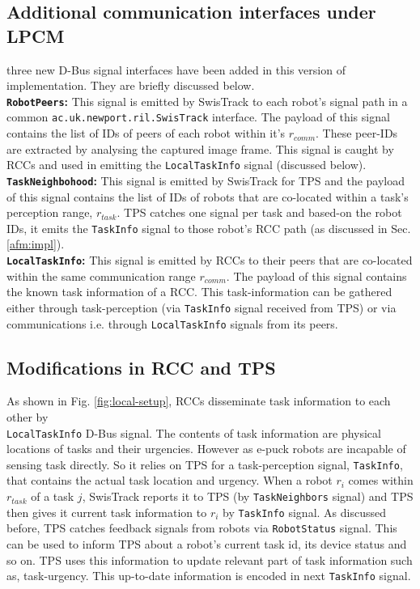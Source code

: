 \subsection*{Additional communication interfaces under LPCM}
 three new D-Bus signal interfaces  have been added in this version of implementation. They are briefly discussed below.\\
\textbf{\texttt{RobotPeers}: }This signal is emitted by SwisTrack to each robot's signal path in a common \texttt{ac.uk.newport.ril.SwisTrack} interface. The payload of this signal contains the list of IDs of peers of each robot within it's $r_{comm}$.  These peer-IDs are extracted by analysing the captured image frame.  This signal is caught by RCCs and used in emitting the \texttt{LocalTaskInfo} signal (discussed below).\\
\textbf{\texttt{TaskNeighbohood}: }This signal is emitted by SwisTrack for TPS and the payload of this signal contains the list of IDs of robots that are co-located within a task's perception range, $r_{task}$. TPS catches one signal per task and based-on the robot IDs, it emits the \texttt{TaskInfo} signal to those robot's RCC path (as discussed in Sec. \ref{afm:impl}).\\ 
\textbf{\texttt{LocalTaskInfo}: }This signal is emitted by RCCs to their peers that are co-located within the same communication range $r_{comm}$. The payload of this signal contains the known task information of a  RCC. This task-information can be gathered either through task-perception (via \texttt{TaskInfo} signal received from TPS) or via communications i.e. through \texttt{LocalTaskInfo} signals from its peers.
\subsection*{Modifications in RCC and TPS}
As shown in Fig. \ref{fig:local-setup}, RCCs disseminate task information to each other by\\ \texttt{LocalTaskInfo} D-Bus signal. The contents of task information are physical locations of tasks and their urgencies. However as e-puck robots are incapable of sensing task directly. So it relies on TPS for a task-perception signal, \texttt{TaskInfo}, that contains the actual task location and urgency. When a robot $r_i$ comes within $r_{task}$ of a task $j$, SwisTrack reports it to TPS (by \texttt{TaskNeighbors} signal) and TPS then gives it current task information to $r_i$ by  \texttt{TaskInfo} signal. As discussed before, TPS catches feedback signals from robots via \texttt{RobotStatus} signal. This can be used to inform TPS about a robot's current task id, its device status and so on. TPS uses this information to update relevant part of task information such as, task-urgency. This up-to-date information is encoded in next \texttt{TaskInfo} signal.

